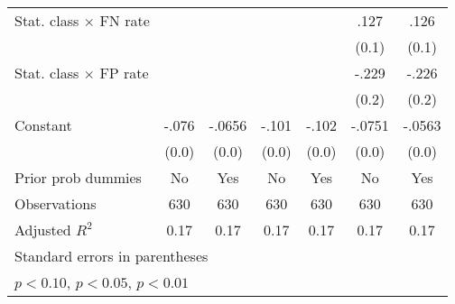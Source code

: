 \begin{table}[htbp]
\begin{tabular}{l*{6}{c}}
Stat. class $\times$ FN rate&                  &                  &                  &                  &     .127         &     .126         \\
                &                  &                  &                  &                  &    (0.1)         &    (0.1)         \\
Stat. class $\times$ FP rate&                  &                  &                  &                  &    -.229         &    -.226         \\
                &                  &                  &                  &                  &    (0.2)         &    (0.2)         \\
Constant        &    -.076\sym{***}&   -.0656\sym{***}&    -.101\sym{***}&    -.102\sym{***}&   -.0751\sym{***}&   -.0563         \\
                &    (0.0)         &    (0.0)         &    (0.0)         &    (0.0)         &    (0.0)         &    (0.0)         \\
Prior prob dummies &       No         &      Yes         &       No         &      Yes         &       No         &      Yes         \\
\hline
Observations    &      630         &      630         &      630         &      630         &      630         &      630         \\
Adjusted \(R^{2}\)&     0.17         &     0.17         &     0.17         &     0.17         &     0.17         &     0.17         \\
\hline\hline
\multicolumn{7}{l}{\footnotesize Standard errors in parentheses}\\
\multicolumn{7}{l}{\footnotesize \sym{*} \(p<0.10\), \sym{**} \(p<0.05\), \sym{***} \(p<0.01\)}\\
\end{tabular}
\end{table}
